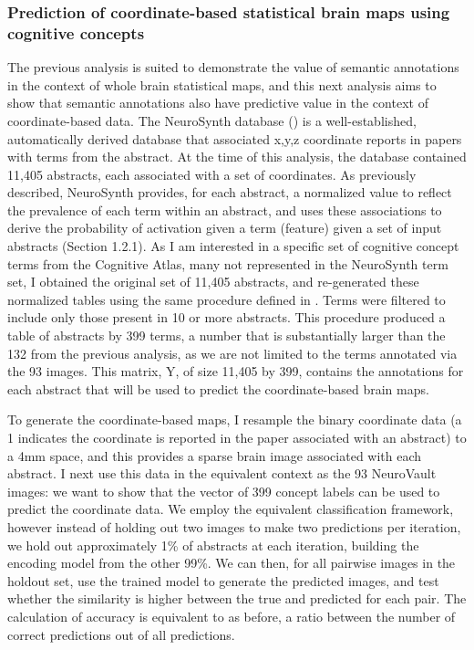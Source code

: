 \documentclass{report}
\begin{document}
\subsubsection{Prediction of coordinate-based statistical brain maps using cognitive concepts}
The previous analysis is suited to demonstrate the value of semantic annotations in the context of whole brain statistical maps, and this next analysis aims to show that semantic annotations also have predictive value in the context of coordinate-based data. The NeuroSynth database (\cite{Yarkoni2011-rg}) is a well-established, automatically derived database that associated x,y,z coordinate reports in papers with terms from the abstract. At the time of this analysis, the database contained 11,405 abstracts, each associated with a set of coordinates. As previously described, NeuroSynth provides, for each abstract, a normalized value to reflect the prevalence of each term within an abstract, and uses these associations to derive the probability of activation given a term (feature) given a set of input abstracts (Section 1.2.1). As I am interested in a specific set of cognitive concept terms from the Cognitive Atlas, many not represented in the NeuroSynth term set, I obtained the original set of 11,405 abstracts, and re-generated these normalized tables using the same procedure defined in \cite{Yarkoni2011-rg}. Terms were filtered to include only those present in 10 or more abstracts. This procedure produced a table of abstracts by 399 terms, a number that is substantially larger than the 132 from the previous analysis, as we are not limited to the terms annotated via the 93 images. This matrix, Y, of size 11,405 by 399, contains the annotations for each abstract that will be used to predict the coordinate-based brain maps.

To generate the coordinate-based maps, I resample the binary coordinate data (a 1 indicates the coordinate is reported in the paper associated with an abstract) to a 4mm space, and this provides a sparse brain image associated with each abstract. I next use this data in the equivalent context as the 93 NeuroVault images: we want to show that the vector of 399 concept labels can be used to predict the coordinate data. We employ the equivalent classification framework, however instead of holding out two images to make two predictions per iteration, we hold out approximately 1\% of abstracts at each iteration, building the encoding model from the other 99\%. We can then, for all pairwise images in the holdout set, use the trained model to generate the predicted images, and test whether the similarity is higher between the true and predicted for each pair. The calculation of accuracy is equivalent to as before, a ratio between the number of correct predictions out of all predictions.
\end{document}
